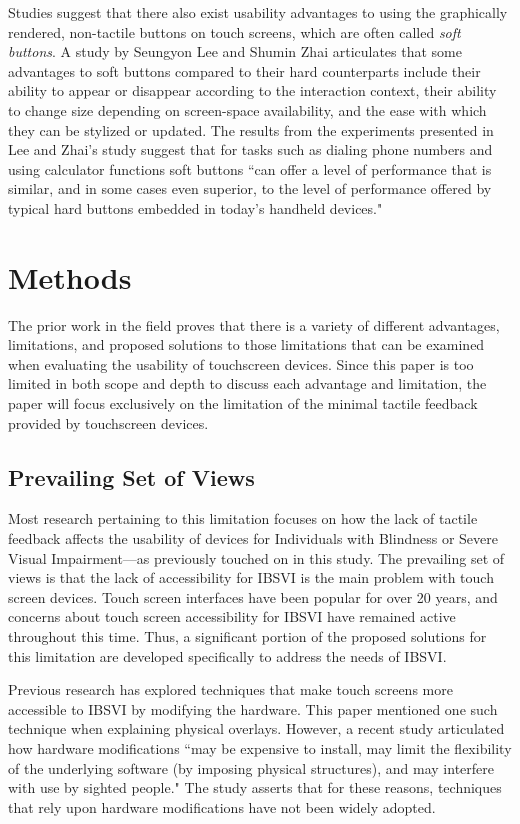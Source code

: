\documentclass[11pt]{article}
\begin{document}
Studies suggest that there also exist usability advantages to using the graphically rendered, non-tactile buttons on touch screens, which are often called \textit{soft buttons}. A study by Seungyon Lee and Shumin Zhai articulates that some advantages to soft buttons compared to their hard counterparts include their ability to appear or disappear according to the interaction context, their ability to change size depending on screen-space availability, and the ease with which they can be stylized or updated.\cite{Lee:2009:PTS:1518701.1518750} The results from the experiments presented in Lee and Zhai's study suggest that for tasks such as  dialing phone numbers and using calculator functions soft buttons ``can offer a level of performance that is similar, and in some cases even superior, to the level of performance offered by typical hard buttons embedded in today's handheld devices." \cite{Lee:2009:PTS:1518701.1518750}


\section{Methods}
The prior work in the field proves that there is a variety of different advantages, limitations, and proposed solutions to those limitations that can be examined when evaluating the usability of touchscreen devices. Since this paper is too limited in both scope and depth to discuss each advantage and limitation, the paper will focus exclusively on the limitation of the minimal tactile feedback provided by touchscreen devices. 

\subsection{Prevailing Set of Views}
Most research pertaining to this limitation focuses on how the lack of tactile feedback affects the usability of devices for Individuals with Blindness or Severe Visual Impairment---as previously touched on in this study. The prevailing set of views is that the lack of accessibility for IBSVI is the main problem with touch screen devices. Touch screen interfaces have been popular for over 20 years, and concerns about touch screen accessibility for IBSVI have remained active throughout this time. \cite{Buxton:1986:HID:22339.22386} Thus, a significant portion of the proposed solutions for this limitation are developed specifically to address the needs of IBSVI.


Previous research has explored techniques that make touch screens more accessible to IBSVI by modifying the hardware. This paper mentioned one such technique when explaining physical overlays.\cite{El-Glaly:2013:TTF:2460625.2460665} However, a recent study articulated how hardware modifications ``may be expensive to install, may limit the flexibility of the underlying software (by imposing physical structures), and may interfere with use by sighted people." \cite{Kane:2011:AOI:2047196.2047232}  The study asserts that for these reasons, techniques that rely upon hardware modifications have not been widely adopted.
\end{document}

